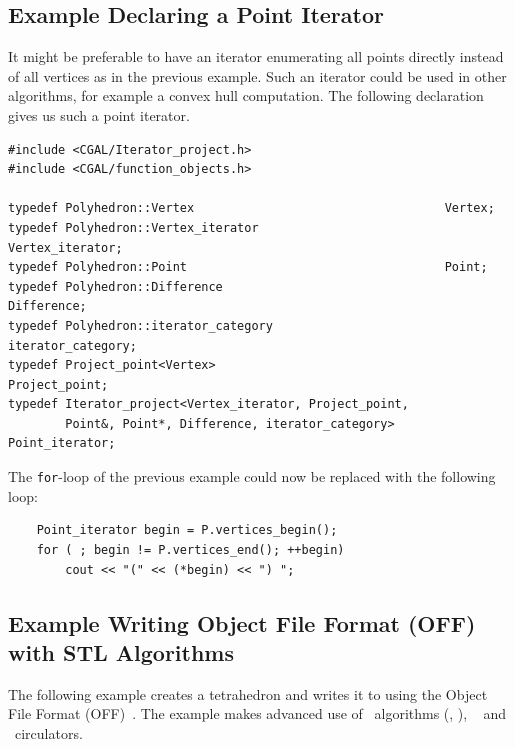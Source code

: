 
\subsection{Example Declaring a Point Iterator}

It might be preferable to have an iterator enumerating all points
directly instead of all vertices as in the previous example. Such an 
iterator could be used in other algorithms, for example a convex hull
computation. The following declaration gives us such a point iterator.

\begin{verbatim}
#include <CGAL/Iterator_project.h>
#include <CGAL/function_objects.h>

typedef Polyhedron::Vertex                                   Vertex;
typedef Polyhedron::Vertex_iterator                          Vertex_iterator;
typedef Polyhedron::Point                                    Point;
typedef Polyhedron::Difference                               Difference;
typedef Polyhedron::iterator_category                        iterator_category;
typedef Project_point<Vertex>                                Project_point;
typedef Iterator_project<Vertex_iterator, Project_point,
        Point&, Point*, Difference, iterator_category>       Point_iterator;
\end{verbatim}

The {\tt for}-loop of the previous example could now be replaced with
the following loop:

\begin{verbatim}
    Point_iterator begin = P.vertices_begin();
    for ( ; begin != P.vertices_end(); ++begin)
        cout << "(" << (*begin) << ") ";
\end{verbatim}



\subsection{Example Writing Object File Format (OFF) with STL Algorithms}

The following example creates a tetrahedron and writes it to
 using the Object File Format (OFF)~\cite{p-gmgv15-94}.
The example makes advanced use of \stl\ algorithms (,
), \stl\  and \cgal\ circulators.

